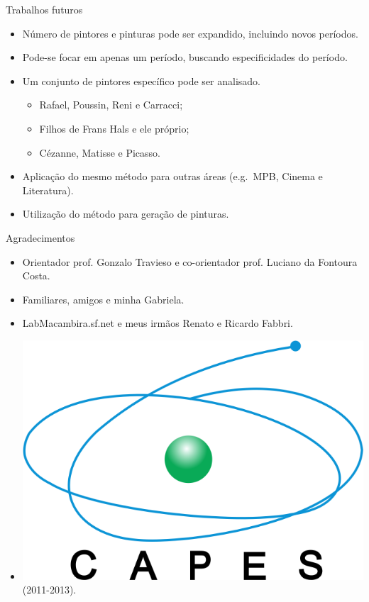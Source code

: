 \documentclass{beamer}
\begin{document}
\begin{frame}{Trabalhos futuros}
  \begin{itemize}
    \item<1> Número de pintores e pinturas pode ser expandido, incluindo novos períodos.

    \item<2> Pode-se focar em apenas um período, buscando especificidades do período.

    \item<3>{Um conjunto de pintores específico pode ser analisado.
    \begin{itemize}
      \item Rafael, Poussin, Reni e Carracci;
      \item Filhos de Frans Hals e ele próprio;
      \item Cézanne, Matisse e Picasso.
    \end{itemize}
    }

    \item<4> Aplicação do mesmo método para outras áreas (e.g.\ MPB, Cinema e Literatura).

    \item<5> Utilização do método para geração de pinturas.

  \end{itemize}

\end{frame}

\begin{frame}{Agradecimentos}
  \begin{itemize}
    \item Orientador prof. Gonzalo Travieso e co-orientador prof. Luciano da Fontoura Costa.

    \item Familiares, amigos e minha Gabriela.

    \item LabMacambira.sf.net e meus irmãos Renato e Ricardo Fabbri.

    \item \includegraphics[scale=.3]{figs/logo_capes} (2011-2013).
  \end{itemize}

\end{frame}
\end{document}
